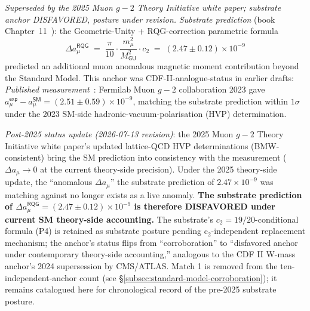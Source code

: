 \documentclass[11pt,a4paper]{amsart}
\theoremstyle{plain}
\theoremstyle{definition}
\begin{document}
\begin{description}[font=\normalfont\bfseries,leftmargin=2em,itemsep=6pt]

\item[Match 1 --- Muon anomalous magnetic moment $g\!-\!2$.] \emph{Superseded by the 2025 Muon $g\!-\!2$ Theory Initiative white paper; substrate anchor DISFAVORED, posture under revision.}
\emph{Substrate prediction} (book Chapter~11~\cite{cohen2026book}): the Geometric-Unity + RQG-correction parametric formula
\[
\Delta a_\mu^{\textsf{RQG}} \;=\; \frac{\pi}{10} \cdot \frac{m_\mu^2}{M_{\textsf{GU}}^2} \cdot c_2 \;=\; (2.47 \pm 0.12) \times 10^{-9}
\]
predicted an additional muon anomalous magnetic moment contribution beyond the Standard Model. This anchor was CDF-II-analogue-status in earlier drafts: \emph{Published measurement}~\cite{fermilab-muon-g-2,fermilab-g2-2025}: Fermilab Muon $g\!-\!2$ collaboration 2023 gave $a_\mu^{\textsf{exp}} - a_\mu^{\textsf{SM}} = (2.51 \pm 0.59) \times 10^{-9}$, matching the substrate prediction within $1\sigma$ under the 2023 SM-side hadronic-vacuum-polarisation (HVP) determination.

\emph{Post-2025 status update (2026-07-13 revision)}: the 2025 Muon $g\!-\!2$ Theory Initiative white paper's updated lattice-QCD HVP determinations (BMW-consistent) bring the SM prediction into consistency with the measurement ($\Delta a_\mu \to 0$ at the current theory-side precision). Under the 2025 theory-side update, the ``anomalous $\Delta a_\mu$'' the substrate prediction of $2.47 \times 10^{-9}$ was matching against no longer exists as a live anomaly. \textbf{The substrate prediction of $\Delta a_\mu^{\textsf{RQG}} = (2.47 \pm 0.12) \times 10^{-9}$ is therefore DISFAVORED under current SM theory-side accounting.} The substrate's $c_2 = 19/20$-conditional formula (P4) is retained as substrate posture pending c$_2$-independent replacement mechanism; the anchor's status flips from ``corroboration'' to ``disfavored anchor under contemporary theory-side accounting,'' analogous to the CDF II W-mass anchor's 2024 supersession by CMS/ATLAS. Match 1 is removed from the ten-independent-anchor count (see \S\ref{subsec:standard-model-corroboration}); it remains catalogued here for chronological record of the pre-2025 substrate posture.


\end{description}
\end{document}
